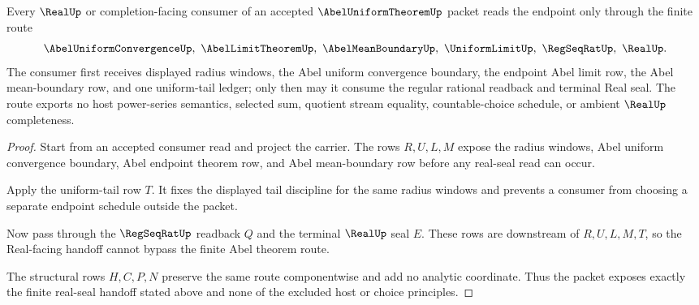 \begin{theorem}
\label{thm:abel-uniform-theorem-real-seal-handoff}
Every $\RealUp$ or completion-facing consumer of an accepted $\AbelUniformTheoremUp$ packet reads the endpoint only through the finite route
$$
\AbelUniformConvergenceUp,\ \AbelLimitTheoremUp,\ \AbelMeanBoundaryUp,\ \UniformLimitUp,\ \RegSeqRatUp,\ \RealUp .
$$
The consumer first receives displayed radius windows, the Abel uniform convergence boundary, the endpoint Abel limit row, the Abel mean-boundary row, and one uniform-tail ledger; only then may it consume the regular rational readback and terminal Real seal. The route exports no host power-series semantics, selected sum, quotient stream equality, countable-choice schedule, or ambient $\RealUp$ completeness.
\end{theorem}
\begin{proof}
Start from an accepted consumer read and project the carrier. The rows $R,U,L,M$ expose the radius windows, Abel uniform convergence boundary, Abel endpoint theorem row, and Abel mean-boundary row before any real-seal read can occur.

Apply the uniform-tail row $T$. It fixes the displayed tail discipline for the same radius windows and prevents a consumer from choosing a separate endpoint schedule outside the packet.

Now pass through the $\RegSeqRatUp$ readback $Q$ and the terminal $\RealUp$ seal $E$. These rows are downstream of $R,U,L,M,T$, so the Real-facing handoff cannot bypass the finite Abel theorem route.

The structural rows $H,C,P,N$ preserve the same route componentwise and add no analytic coordinate. Thus the packet exposes exactly the finite real-seal handoff stated above and none of the excluded host or choice principles.
\end{proof}



